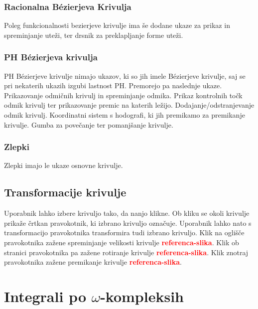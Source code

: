 \documentclass[isrm2, tisk]{fmfdelo}
\newcommand{\mycomment}[1]{\textbf{\textcolor{red}{#1}}}
\newcommand{\missingref}[1]{\mycomment{referenca-#1}}
\begin{document}
    \subsubsection{Racionalna Bézierjeva Krivulja}
    Poleg funkcionalnosti bezierjeve krivulje ima še dodane ukaze za prikaz in spreminjanje uteži, ter drsnik za preklapljanje forme uteži.

    \subsubsection{PH Bézierjeva krivulja}
    PH Bézierjeve krivulje nimajo ukazov, ki so jih imele Bézierjeve krivulje, saj se pri nekaterih ukazih izgubi lastnost PH.
    Premorejo pa naslednje ukaze.
    Prikazovanje odmičnih krivulj in spreminjanje odmika.
    Prikaz kontrolnih točk odmik krivulj ter prikazovanje premic na katerih ležijo.
    Dodajanje/odstranjevanje odmik krivulj.
    Koordinatni sistem s hodografi, ki jih premikamo za premikanje krivulje.
    Gumba za povečanje ter pomanjšanje krivulje.

    \subsubsection{Zlepki}
    Zlepki imajo le ukaze osnovne krivulje.

    \subsection{Transformacije krivulje}
    Uporabnik lahko izbere krivuljo tako, da nanjo klikne.
    Ob kliku se okoli krivulje prikaže črtkan pravokotnik, ki izbrano krivuljo označuje.
    Uporabnik lahko nato s transformacijo pravokotnika transformira tudi izbrano krivuljo.
    Klik na oglišče pravokotnika zažene spreminjanje velikosti krivulje \missingref{slika}.
    Klik ob stranici pravokotnika pa zažene rotiranje krivulje \missingref{slika}.
    Klik znotraj pravokotnika zažene premikanje krivulje \missingref{slika}.





















    \newpage


    \section{Integrali po \texorpdfstring{$\omega$}{ω}-kompleksih}
\end{document}
